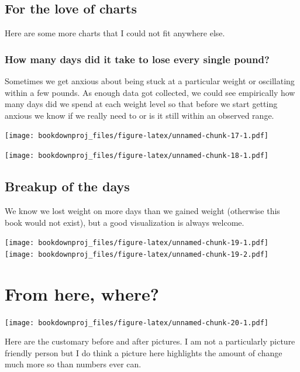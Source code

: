 \documentclass[
  oneside]{book}
\begin{document}
\hypertarget{for-the-love-of-charts}{%
\section{For the love of charts}\label{for-the-love-of-charts}}

Here are some more charts that I could not fit anywhere else.

\hypertarget{how-many-days-did-it-take-to-lose-every-single-pound}{%
\subsection{How many days did it take to lose every single pound?}\label{how-many-days-did-it-take-to-lose-every-single-pound}}

Sometimes we get anxious about being stuck at a particular weight or oscillating within a few pounds. As enough data got collected, we could see empirically how many days did we spend at each weight level so that before we start getting anxious we know if we really need to or is it still within an observed range.

\texttt{[image: bookdownproj\_files/figure-latex/unnamed-chunk-17-1.pdf]}

\texttt{[image: bookdownproj\_files/figure-latex/unnamed-chunk-18-1.pdf]}

\hypertarget{breakup-of-the-days}{%
\section{Breakup of the days}\label{breakup-of-the-days}}

We know we lost weight on more days than we gained weight (otherwise this book would not exist), but a good visualization is always welcome.

\texttt{[image: bookdownproj\_files/figure-latex/unnamed-chunk-19-1.pdf]} \texttt{[image: bookdownproj\_files/figure-latex/unnamed-chunk-19-2.pdf]}

\hypertarget{from-here-where}{%
\chapter{From here, where?}\label{from-here-where}}

\texttt{[image: bookdownproj\_files/figure-latex/unnamed-chunk-20-1.pdf]}

Here are the customary before and after pictures. I am not a particularly picture friendly person but I do think a picture here highlights the amount of change much more so than numbers ever can.
\end{document}
